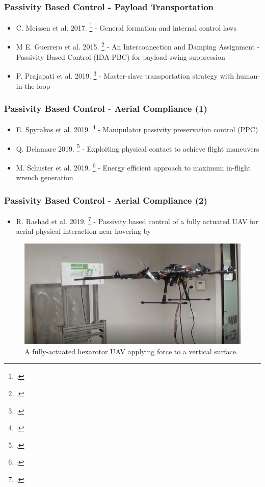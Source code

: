 \begin{frame}
	\frametitle{Passivity Based Control - Payload Transportation}
	\begin{itemize}
		\item C. Meissen et al. 2017. \footcite{passivity-based-formation-load} - General formation and internal control laws
		\item M E. Guerrero et al. 2015. \footcite{passivity-based-payload-minimum-swing} - An Interconnection and Damping Assignment - Passivity Based Control (IDA-PBC) for payload swing suppression
		\item P. Prajapati et al. 2019. \footcite{payload-and-human} - Master-slave transportation strategy with human-in-the-loop
	\end{itemize}
\end{frame}

\begin{frame}
	\frametitle{Passivity Based Control - Aerial Compliance (1)}
	
	\begin{itemize}
		\item E. Spyrakos et al. 2019. \footcite{passive-variable-impedance-compliant} - Manipulator passivity preservation control (PPC)
		\item Q. Delamare 2019. \footcite{quadrotor-itneraction-environment} - Exploiting physical contact to achieve flight maneuvers
		\item M. Schuster et al. 2019. \footcite{max-wrench-min-energy} - Energy efficient approach to maximum in-flight wrench generation
	\end{itemize}
\end{frame}

\begin{frame}
	\frametitle{Passivity Based Control - Aerial Compliance (2)}
	\begin{itemize}
		\item R. Rashad et al. 2019. \footcite{passivity-based-physical-interaction} - Passivity based control of a fully actuated UAV for aerial physical interaction near hovering by 
	\end{itemize}
	\begin{figure}[H]
		\includegraphics[width=0.6\columnwidth]{figures/passivity-based-interaction.png}	
		\centering
		\caption{A fully-actuated hexarotor UAV applying force to a vertical surface.}
		\label{fig:aerial_compliance}
	\end{figure}
 \end{frame}

